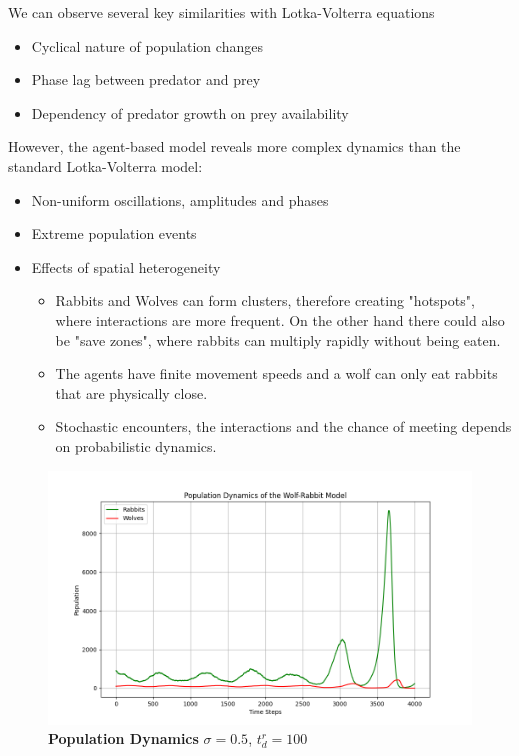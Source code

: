\newline
We can observe several key similarities with Lotka-Volterra equations
\begin{itemize}
	\item Cyclical nature of population changes
	\item Phase lag between predator and prey
	\item Dependency of predator growth on prey availability
\end{itemize}
However, the agent-based model reveals more complex dynamics than the standard Lotka-Volterra model:
\begin{itemize}
	\item Non-uniform oscillations, amplitudes and phases
	\item Extreme population events
	\item Effects of spatial heterogeneity
		\begin{itemize}
			\item Rabbits and Wolves can form clusters, therefore creating "hotspots", where interactions are more frequent. On the other hand there could also be "save zones", where rabbits can multiply rapidly without being eaten.
			\item The agents have finite movement speeds and a wolf can only eat rabbits that are physically close.
			\item Stochastic encounters, the interactions and the chance of meeting depends on probabilistic dynamics.
		\end{itemize}
\end{itemize}
\begin{figure}[H]
	\centering
	\includegraphics[width=\textwidth]{media/population_dynamics_ex01.png}
	\caption{
		\textbf{Population Dynamics}
		$\sigma = 0.5$, $t_d^r = 100$
	}
	\label{fig:ex01}
\end{figure}

